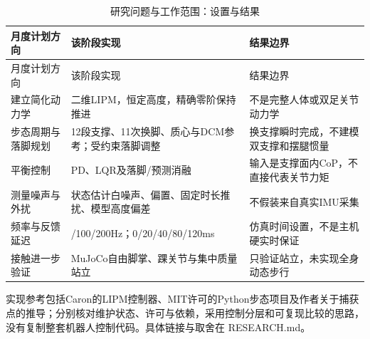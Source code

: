 \FloatBarrier\begingroup\small\setlength{\tabcolsep}{2.5pt}
\begin{longtable}[]{@{}
  >{\raggedright\arraybackslash}p{}
  >{\raggedright\arraybackslash}p{}
  >{\raggedright\arraybackslash}p{}@{}}
\caption{研究问题与工作范围：设置与结果}\label{tab:s17-1}\tabularnewline
\toprule\noalign{}
\begin{minipage}[b]{\linewidth}\raggedright
月度计划方向
\end{minipage} & \begin{minipage}[b]{\linewidth}\raggedright
该阶段实现
\end{minipage} & \begin{minipage}[b]{\linewidth}\raggedright
结果边界
\end{minipage} \\
\midrule\noalign{}
\endfirsthead
\toprule\noalign{}
\begin{minipage}[b]{\linewidth}\raggedright
月度计划方向
\end{minipage} & \begin{minipage}[b]{\linewidth}\raggedright
该阶段实现
\end{minipage} & \begin{minipage}[b]{\linewidth}\raggedright
结果边界
\end{minipage} \\
\midrule\noalign{}
\endhead
\bottomrule\noalign{}
\endlastfoot
建立简化动力学 & 二维LIPM，恒定高度，精确零阶保持推进 & 不是完整人体或双足关节动力学 \\
步态周期与落脚规划 & 12段支撑、11次换脚、质心与DCM参考；受约束落脚调整 & 换支撑瞬时完成，不建模双支撑和摆腿惯量 \\
平衡控制 & PD、LQR及落脚/预测消融 & 输入是支撑面内CoP，不直接代表关节力矩 \\
测量噪声与外扰 & 状态估计白噪声、偏置、固定时长推扰、模型高度偏差 & 不假装来自真实IMU采集 \\
频率与反馈延迟 & 50/100/200Hz；0/20/40/80/120ms & 仿真时间设置，不是主机硬实时保证 \\
接触进一步验证 & MuJoCo自由脚掌、踝关节与集中质量站立 & 只验证站立，未实现全身动态步行 \\
\end{longtable}\endgroup

实现参考包括Caron的LIPM控制器、MIT许可的Python步态项目及作者关于捕获点的推导；分别核对维护状态、许可与依赖，采用控制分层和可复现比较的思路，没有复制整套机器人控制代码。具体链接与取舍在 RESEARCH.md。

